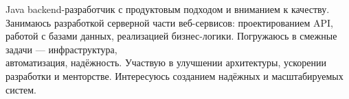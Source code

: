 

\begin{cvparagraph}


Java backend-разработчик с продуктовым подходом и вниманием к качеству. Занимаюсь разработкой серверной части веб-сервисов: проектированием API, работой с базами данных, 
реализацией бизнес-логики. Погружаюсь в смежные задачи — инфраструктура, \\ 
автоматизация, надёжность. Участвую в улучшении архитектуры, ускорении разработки и менторстве. Интересуюсь созданием надёжных и масштабируемых систем.

\end{cvparagraph}

\vspace{-12mm}
